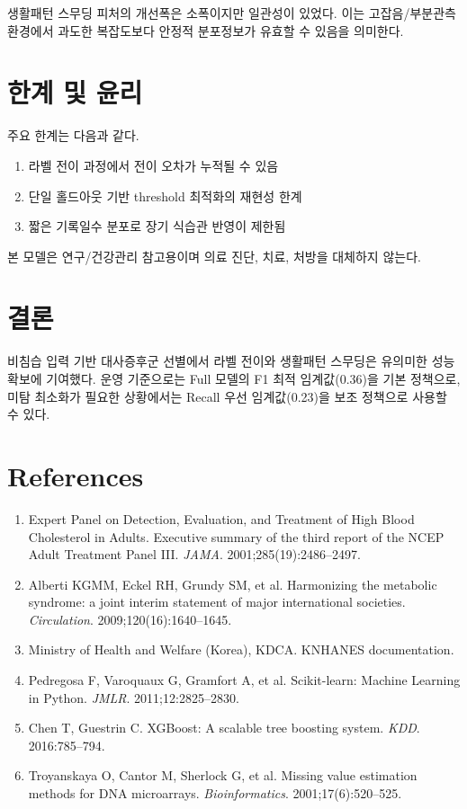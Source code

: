 \documentclass[10pt,twocolumn]{article}
\begin{document}
생활패턴 스무딩 피처의 개선폭은 소폭이지만 일관성이 있었다.
이는 고잡음/부분관측 환경에서 과도한 복잡도보다 안정적 분포정보가 유효할 수 있음을 의미한다.

\section{한계 및 윤리}
주요 한계는 다음과 같다.
\begin{enumerate}[leftmargin=1.2em]
\item 라벨 전이 과정에서 전이 오차가 누적될 수 있음
\item 단일 홀드아웃 기반 threshold 최적화의 재현성 한계
\item 짧은 기록일수 분포로 장기 식습관 반영이 제한됨
\end{enumerate}
본 모델은 연구/건강관리 참고용이며 의료 진단, 치료, 처방을 대체하지 않는다.

\section{결론}
비침습 입력 기반 대사증후군 선별에서 라벨 전이와 생활패턴 스무딩은 유의미한 성능 확보에 기여했다.
운영 기준으로는 Full 모델의 F1 최적 임계값(0.36)을 기본 정책으로, 미탐 최소화가 필요한 상황에서는 Recall 우선 임계값(0.23)을 보조 정책으로 사용할 수 있다.

\section*{References}
\begin{enumerate}[leftmargin=1.2em]
\item Expert Panel on Detection, Evaluation, and Treatment of High Blood Cholesterol in Adults. Executive summary of the third report of the NCEP Adult Treatment Panel III. \textit{JAMA}. 2001;285(19):2486--2497.
\item Alberti KGMM, Eckel RH, Grundy SM, et al. Harmonizing the metabolic syndrome: a joint interim statement of major international societies. \textit{Circulation}. 2009;120(16):1640--1645.
\item Ministry of Health and Welfare (Korea), KDCA. KNHANES documentation.
\item Pedregosa F, Varoquaux G, Gramfort A, et al. Scikit-learn: Machine Learning in Python. \textit{JMLR}. 2011;12:2825--2830.
\item Chen T, Guestrin C. XGBoost: A scalable tree boosting system. \textit{KDD}. 2016:785--794.
\item Troyanskaya O, Cantor M, Sherlock G, et al. Missing value estimation methods for DNA microarrays. \textit{Bioinformatics}. 2001;17(6):520--525.
\end{enumerate}
\end{document}
